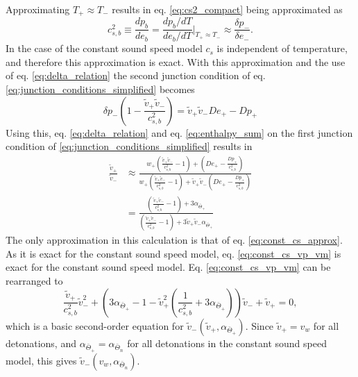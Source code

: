 Approximating $T_+ \approx T_-$ results in eq. \eqref{eq:cs2_compact} being approximated as
\begin{equation}
c_{s,b}^2
\equiv \frac{dp_b}{de_b}
= \frac{dp_b/dT}{de_b/dT} \big|_{T_+ \approx T_-}
\approx \frac{\delta p_-}{\delta e_-}.
\label{eq:const_cs_approx}
\end{equation}
In the case of the constant sound speed model $c_{s}$ is independent of temperature, and therefore this approximation is exact.
With this approximation and the use of eq. \eqref{eq:delta_relation} the second junction condition of eq. \eqref{eq:junction_conditions_simplified} becomes
\begin{equation}
\delta p_- \left(1 - \frac{\tilde{v}_+ \tilde{v}_-}{c_{s,b}^2} \right) = \tilde{v}_+ \tilde{v}_- De_+ - Dp_+
\end{equation}
Using this, eq. \eqref{eq:delta_relation} and eq. \eqref{eq:enthalpy_sum} on the first junction condition of \eqref{eq:junction_conditions_simplified} results in
\begin{align}
\frac{\tilde{v}_+}{\tilde{v}_-}
&\approx \frac{
w_+ \left( \frac{\tilde{v}_+ \tilde{v}_-}{c_{s,b}^2} - 1 \right) + \left( De_+ - \frac{Dp_+}{c_{s,b}^2} \right)
}{
w_+ \left( \frac{\tilde{v}_+ \tilde{v}_-}{c_{s,b}^2} - 1 \right) + \tilde{v}_+ \tilde{v}_- \left( De_+ - \frac{Dp_+}{c_{s,b}^2} \right)
} \\
&= \frac{ \left( \frac{\tilde{v}_+ \tilde{v}_-}{c_{s,b}^2} - 1 \right) + 3 \alpha_{\bar{\Theta}_+}
}{
\left( \frac{\tilde{v}_+ \tilde{v}_-}{c_{s,b}^2} - 1 \right) + 3\tilde{v}_+ \tilde{v}_- \alpha_{\bar{\Theta}_+}}
\label{eq:const_cs_vp_vm}
\end{align}
The only approximation in this calculation is that of eq. \eqref{eq:const_cs_approx}.
As it is exact for the constant sound speed model,
eq. \eqref{eq:const_cs_vp_vm} is exact for the constant sound speed model.
Eq. \eqref{eq:const_cs_vp_vm} can be rearranged to
\begin{equation}
\frac{\tilde{v}_+}{c_{s,b}^2} \tilde{v}_-^2
+ \left(3 \alpha_{\bar{\Theta}_+} - 1 - \tilde{v}_+^2 \left(\frac{1}{c_{s,b}^2} + 3 \alpha_{\bar{\Theta}_+} \right) \right) \tilde{v}_-
+ \tilde{v}_+
= 0,
\end{equation}
which is a basic second-order equation for $\tilde{v}_- ( \tilde{v}_+, \alpha_{\bar{\Theta}_+} )$.
Since $\tilde{v}_+ = v_w$ for all detonations, and $\alpha_{\bar{\Theta}_+} = \alpha_{\bar{\Theta}_n}$ for all detonations in the constant sound speed model, this gives $\tilde{v}_- ( v_w, \alpha_{\bar{\Theta}_n} )$.
